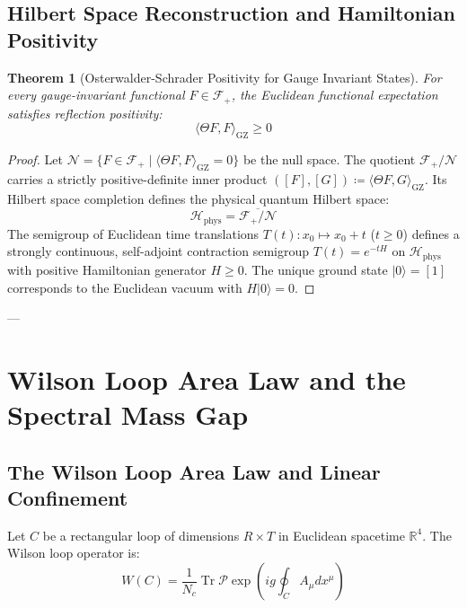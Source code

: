 \documentclass[11pt,a4paper]{article}
\newtheorem{theorem}{Theorem}[section]
\theoremstyle{definition}
\begin{document}
\subsection{Hilbert Space Reconstruction and Hamiltonian Positivity}
\begin{theorem}[Osterwalder-Schrader Positivity for Gauge Invariant States]
For every gauge-invariant functional $F \in \mathcal{F}_+$, the Euclidean functional expectation satisfies reflection positivity:
\begin{equation}
\langle \Theta F, F \rangle_{\mathrm{GZ}} \ge 0
\end{equation}
\end{theorem}
\begin{proof}
Let $\mathcal{N} = \{ F \in \mathcal{F}_+ \mid \langle \Theta F, F \rangle_{\mathrm{GZ}} = 0 \}$ be the null space. The quotient $\mathcal{F}_+ / \mathcal{N}$ carries a strictly positive-definite inner product $([F], [G]) \coloneqq \langle \Theta F, G \rangle_{\mathrm{GZ}}$.
Its Hilbert space completion defines the physical quantum Hilbert space:
\begin{equation}
\mathcal{H}_{\mathrm{phys}} = \overline{\mathcal{F}_+ / \mathcal{N}}
\end{equation}
The semigroup of Euclidean time translations $T(t) : x_0 \mapsto x_0 + t$ ($t \ge 0$) defines a strongly continuous, self-adjoint contraction semigroup $T(t) = e^{-t H}$ on $\mathcal{H}_{\mathrm{phys}}$ with positive Hamiltonian generator $H \ge 0$.
The unique ground state $|0\rangle = [1]$ corresponds to the Euclidean vacuum with $H |0\rangle = 0$.
\end{proof}

---

\section{Wilson Loop Area Law and the Spectral Mass Gap}

\subsection{The Wilson Loop Area Law and Linear Confinement}
Let $C$ be a rectangular loop of dimensions $R \times T$ in Euclidean spacetime $\mathbb{R}^4$. The Wilson loop operator is:
\begin{equation}
W(C) = \frac{1}{N_c} \operatorname{Tr} \mathcal{P} \exp\left( i g \oint_C A_\mu dx^\mu \right)
\end{equation}
\end{document}
